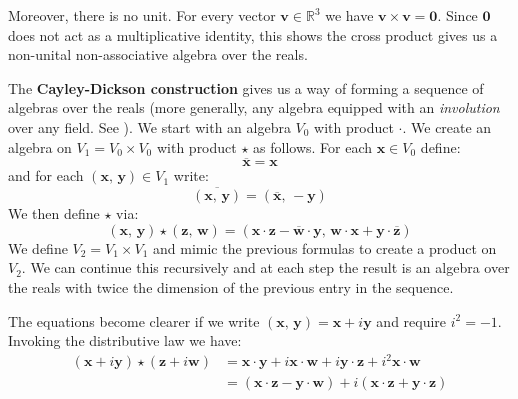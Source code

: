 \documentclass{article}
\begin{document}
            Moreover, there is no unit. For every vector
            $\mathbf{v}\in\mathbb{R}^{3}$ we have
            $\mathbf{v}\times\mathbf{v}=\mathbf{0}$. Since $\mathbf{0}$ does
            not act as a multiplicative identity, this shows the cross product
            gives us a non-unital non-associative algebra over the reals.
            \par\hfill\par
            The \textbf{Cayley-Dickson construction} gives us a way of forming
            a sequence of algebras over the reals
            (more generally, any algebra equipped with an
            \textit{involution} over any field. See
            \cite[p.~45]{SchaferNonassociativeAlgebras}).
            We start with an algebra $V_{0}$ with product $\cdot$.
            We create an algebra on $V_{1}=V_{0}\times{V}_{0}$ with product
            $\star$ as follows. For each $\mathbf{x}\in{V}_{0}$ define:
            \begin{equation}
                \overline{\mathbf{x}}=\mathbf{x}
            \end{equation}
            and for each $(\mathbf{x},\,\mathbf{y})\in{V}_{1}$ write:
            \begin{equation}
                \overline{(\mathbf{x},\,\mathbf{y})}
                =(\overline{\mathbf{x}},\,-\mathbf{y})
            \end{equation}
            We then define $\star$ via:
            \begin{equation}
                (\mathbf{x},\,\mathbf{y})\star(\mathbf{z},\,\mathbf{w})
                =(\mathbf{x}\cdot\mathbf{z}-
                    \overline{\mathbf{w}}\cdot\mathbf{y},\,
                \mathbf{w}\cdot\mathbf{x}+
                    \mathbf{y}\cdot\overline{\mathbf{z}})
            \end{equation}
            We define $V_{2}=V_{1}\times{V}_{1}$ and mimic the previous formulas
            to create a product on $V_{2}$. We can continue this recursively
            and at each step the result is an algebra over the reals with twice
            the dimension of the previous entry in the sequence.
            \par\hfill\par
            The equations become clearer if we write
            $(\mathbf{x},\,\mathbf{y})=\mathbf{x}+i\mathbf{y}$ and require
            $i^{2}=-1$. Invoking the distributive law we have:
            \begin{subequations}
                \begin{align}
                    (\mathbf{x}+i\mathbf{y})\star(\mathbf{z}+i\mathbf{w})
                    &=\mathbf{x}\cdot\mathbf{y}
                        +i\mathbf{x}\cdot\mathbf{w}
                        +i\mathbf{y}\cdot\mathbf{z}
                        +i^{2}\mathbf{x}\cdot\mathbf{w}\\
                    &=(\mathbf{x}\cdot\mathbf{z}-\mathbf{y}\cdot\mathbf{w})
                        +i(\mathbf{x}\cdot\mathbf{z}+\mathbf{y}\cdot\mathbf{z})
                \end{align}
            \end{subequations}
\end{document}
